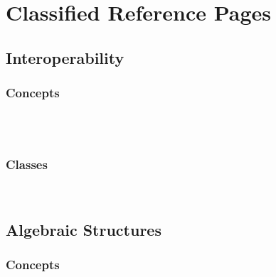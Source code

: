 


%

\section{Classified Reference Pages}
\label{caf_ref::classified_refernce_pages}

\subsection*{Interoperability}
\subsubsection*{Concepts}
\\
\\
\subsubsection*{Classes}
\\

\subsection*{Algebraic Structures}
\label{caf_ref::algebraic_structures}

\subsubsection*{Concepts}

